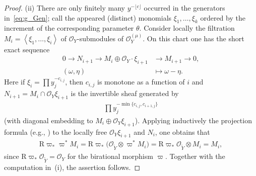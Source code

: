 \documentclass[11pt]{article}
\newcommand{\sO}{\mathscr{O}}
\newcommand{\flr}[1]{\lfloor #1 \rfloor}
\newcommand{\gen}[1]{\left\langle #1 \right\rangle}
\newcommand{\RD}{\mathrm{R}}
\begin{document}
\begin{proof}
(ii) There are only finitely many $y^{-\flr{c}}$ occurred in the generators in~\eqref{eq:g_Gen}; call the appeared (distinct) monomials $\xi_1,\dots,\xi_k$ ordered by the increment of the corresponding parameter $\theta$.
Consider locally the filtration $M_i = \gen{\xi_1,\dots,\xi_i}$ of $\sO_Y$-submodules of $\sO_Y^{(\mu)}$. On this chart one has the short exact sequence
\begin{align*}
0 \to N_{i+1} \to M_i\oplus \sO_Y\cdot\xi_{i+1} & \to M_{i+1} \to 0, \\
(\omega, \eta) & \mapsto \omega - \eta.
\end{align*}
Here if $\xi_i = \prod y_j^{-c_{i,j}}$, then $c_{i,j}$ is monotone as a function of $i$ and $N_{i+1} = M_i\cap \sO_Y\xi_{i+1}$ is the invertible sheaf generated by
\begin{gather*} \prod y_j^{-\min\{c_{i,j}, c_{i+1,j} \}} \end{gather*}
(with diagonal embedding to $M_i\oplus \sO_Y\xi_{i+1}$). Applying inductively the projection formula (e.g., \cite[Exercise~III.8.3]{H}) to the locally free $\sO_Y\xi_{i+1}$ and $N_i$, one obtains that
\begin{gather*} \RD\varpi_*\varpi^*M_i= \RD\varpi_*\big(\sO_{\widetilde{Y}}\otimes\varpi^*M_i\big)= \RD\varpi_*\sO_{\widetilde{Y}}\otimes M_i = M_i, \end{gather*}
since $\RD\varpi_*\sO_{\widetilde{Y}} = \sO_Y$ for the birational morphism $\varpi$. Together with the computation in~(i), the assertion follows.
\end{proof}
\end{document}

